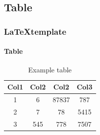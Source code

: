 \subsection{Table}
\begin{frame}
  \frametitle{\LaTeX template}
  \framesubtitle{Table}

  \begin{center}
    \begin{table}
      \begin{tabular}{|c|c|c|c|}
       \hline
       \rowcolor{tableFirstRowColor} Col1 & Col2 & Col2 & Col3 \\ [0.5ex]
       \hline
       1 & 6 & 87837 & 787 \\
       \hline
       2 & 7 & 78 & 5415 \\
       \hline
       3 & 545 & 778 & 7507 \\
       \hline
      \end{tabular}
      \caption{Example table}
    \end{table}
  \end{center}
\end{frame}
